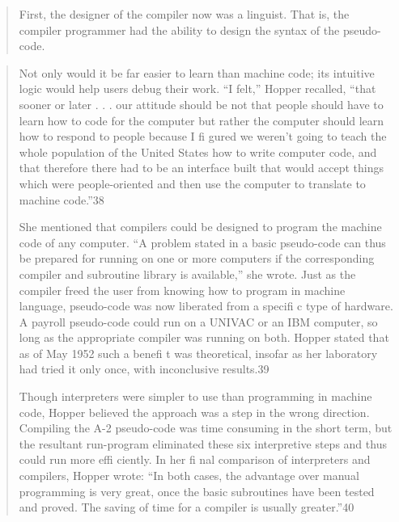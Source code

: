 \begin{quotation}
First, the designer of the compiler now was a linguist. That is,
the compiler programmer had the ability to design the syntax of
the pseudo-code.
\end{quotation}
\begin{quotation}
Not only would it be far easier to learn
than machine code; its intuitive logic would help users debug
their work. “I felt,” Hopper recalled, “that sooner or later . . .
our attitude should be not that people should have to learn how
to code for the computer but rather the computer should learn
how to respond to people because I fi gured we weren’t going to
teach the whole population of the United States how to write
computer code, and that therefore there had to be an interface
built that would accept things which were people-oriented and
then use the computer to translate to machine code.”38

She mentioned that compilers
could be designed to program the machine code of any computer. “A problem stated in a basic pseudo-code can thus be
prepared for running on one or more computers if the corresponding compiler and subroutine library is available,” she wrote.
Just as the compiler freed the user from knowing how to program
in machine language, pseudo-code was now liberated from a
specifi c type of hardware. A payroll pseudo-code could run on
a UNIVAC or an IBM computer, so long as the appropriate
compiler was running on both. Hopper stated that as of May
1952 such a benefi t was theoretical, insofar as her laboratory had
tried it only once, with inconclusive results.39

Though interpreters were simpler to use than programming in
machine code, Hopper believed the approach was a step in the
wrong direction. Compiling the A-2 pseudo-code was time consuming in the short term, but the resultant run-program eliminated these six interpretive steps and thus could run more
effi ciently. In her fi nal comparison of interpreters and compilers,
Hopper wrote: “In both cases, the advantage over manual programming is very great, once the basic subroutines have been
tested and proved. The saving of time for a compiler is usually
greater.”40
\end{quotation}


